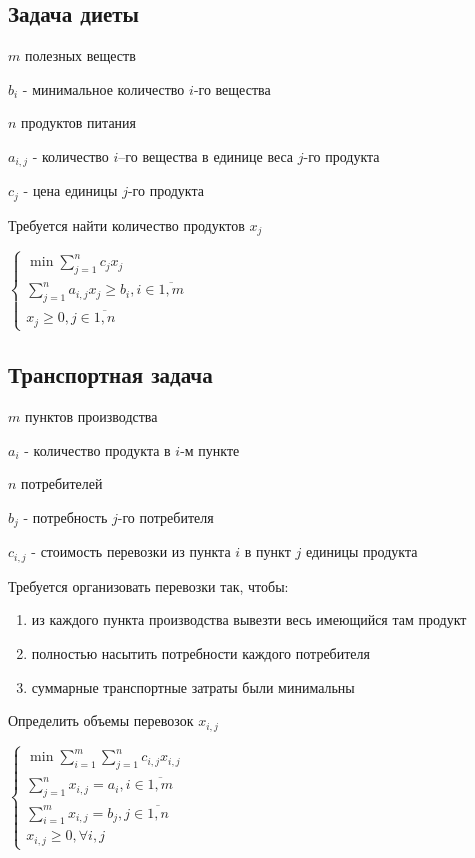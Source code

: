 \documentclass[11pt]{article}
\begin{document}
\begin{sloppypar}
  \subsection*{Задача диеты}
  $m$ полезных веществ
  
  $b_i$ - минимальное количество $i$-го вещества
  
  $n$ продуктов питания

  $a_{i, j}$ - количество $i$–го вещества в единице веса $j$-го продукта

  $c_j$ - цена единицы $j$-го продукта

  Требуется найти количество продуктов $x_j$
  
  $\begin{cases}
    \min \sum_{j = 1}^n c_j x_j \\
    \sum_{j = 1}^n a_{i, j} x_j \geq b_i, i \in \overline{1, m} \\
    x_j \geq 0, j \in \overline{1, n}
  \end{cases}$
  
  \subsection*{Транспортная задача}
  $m$ пунктов производства
  
  $a_i$ - количество продукта в $i$-м пункте 

  $n$ потребителей

  $b_j$ - потребность $j$-го потребителя
  
  $c_{i, j}$ - стоимость перевозки из пункта $i$ в пункт $j$ единицы продукта
  
  Требуется организовать перевозки так, чтобы:
  \begin{enumerate}
    \item из каждого пункта производства вывезти весь имеющийся там продукт 
    \item полностью насытить потребности каждого потребителя
    \item суммарные транспортные затраты были минимальны
  \end{enumerate}
  
  Определить объемы перевозок $x_{i, j}$
  
  $\begin{cases}
    \min \sum_{i = 1}^m \sum_{j = 1}^n c_{i, j} x_{i, j} \\
    \sum_{j = 1}^n x_{i, j} = a_i, i \in \overline{1, m} \\
    \sum_{i = 1}^m x_{i, j} = b_j, j \in \overline{1, n} \\
    x_{i, j} \geq 0, \forall i, j
  \end{cases}$
  

\end{sloppypar}
\end{document}
